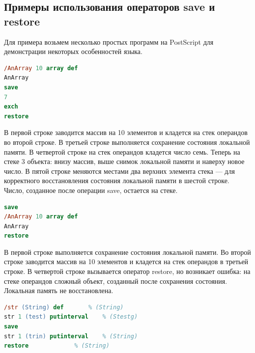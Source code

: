 \subsection{Примеры использования операторов save и restore}

Для примера возьмем несколько простых программ на PostScript для демонстрации некоторых особенностей языка. 


\begin{lstlisting}[label=PostScript-example3,caption=Простой объект на стеке операндов после операции save, language = PostScript]
/AnArray 10 array def
AnArray
save
7
exch
restore
\end{lstlisting}

В первой строке заводится массив на 10 элементов и кладется на стек операндов во второй строке. В третьей строке выполняется сохранение состояния локальной памяти. В четвертой строке на стек операндов кладется число семь. Теперь на стеке 3 объекта: внизу массив, выше снимок локальной памяти и наверху новое число. В пятой строке меняются местами два верхних элемента стека --- для корректного восстановления состояния локальной памяти в шестой строке. Число, созданное после операции save, остается на стеке.


\begin{lstlisting}[label=PostScript-example4,caption=Сложный объект на стеке операндов после операции save, language = PostScript]
save
/AnArray 10 array def
AnArray
restore
\end{lstlisting}

В первой строке выполняется сохранение состояния локальной памяти. Во второй строке заводится массив на 10 элементов и кладется на стек операндов в третьей строке. В четвертой строке вызывается оператор restore, но возникает ошибка: на стеке операндов сложный объект, созданный после сохранения состояния. Локальная память не восстановлена.


\begin{lstlisting}[label=PostScript-example1,caption=Изменение значения строки, language = PostScript]
/str (String) def 		% (String)
str 1 (test) putinterval	% (Stestg)
save
str 1 (trin) putinterval	% (String)
restore				% (String)
\end{lstlisting}


